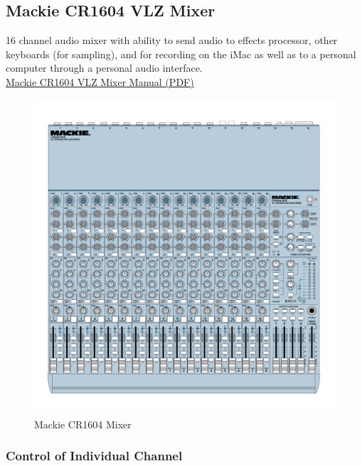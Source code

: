 \subsection{Mackie CR1604 VLZ Mixer}

16 channel audio mixer with ability to send audio to effects processor, other keyboards (for sampling), and for recording on the iMac as well as to a personal computer through a personal audio interface.\\
\linebreak
\href{https://github.com/dkadyrov/MIDILab/blob/master/Manuals/Mackie_Manual.pdf}{Mackie CR1604 VLZ Mixer Manual (PDF)}


\begin{figure}[h]
\centering
\includegraphics[width=.85\textwidth]{Images/Mackie_Manual-1.png}
\caption{Mackie CR1604 Mixer}
\end{figure}

\newpage

\subsubsection{Control of Individual Channel}


